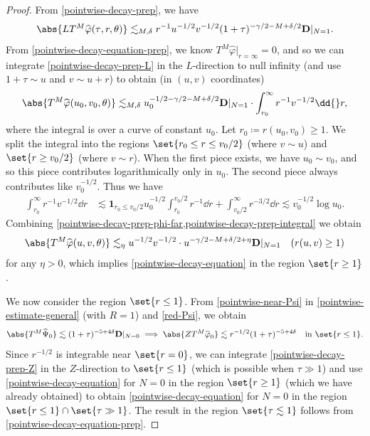 \documentclass[10pt, reqno]{amsart}
\begin{document}
\begin{proof}
From \cref{pointwise-decay-prep}, we have
\begin{equation}\label{pointwise-decay-prep-L}
\abs{LT^M\widehat{\varphi{}}(\tau{},r,\theta{})}\lesssim_{M,\delta{}} r^{-1}u^{-1/2}v^{-1/2}(1+\tau)^{-\gamma{}/2-M+\delta{}/2}\mathbf{D}|_{N=1}.
\end{equation}
From \cref{pointwise-decay-equation-prep}, we know \(T^M\widehat{\varphi{}}|_{r=\infty} = 0\),
and so we can integrate \cref{pointwise-decay-prep-L} in the \(L\)-direction to
null infinity (and use \(1 + \tau{}\sim u\) and \(v\sim u + r\)) to obtain (in \((u,v)\) coordinates)
\begin{equation}\label{pointwise-decay-prep-phi-far}
\abs{T^M\widehat{\varphi{}}(u_0,v_0,\theta{})}\lesssim_{M,\delta{}} u_0^{-1/2-\gamma{}/2-M+\delta{}/2}\mathbf{D}|_{N=1}\cdot \int_{r_0}^\infty r^{-1}v^{-1/2}\dd{}r,
\end{equation}
where the integral is over a curve of constant \(u_0\). Let
\(r_0\coloneqq{}r(u_0,v_0)\ge 1\). We split the integral into the regions
\(\set{r_0\le r\le v_0/2}\) (where \(v\sim u\)) and \(\set{r\ge v_0/2}\) (where
\(v\sim r\)). When the first piece exists, we have \(u_0\sim v_0\), and so this
piece contributes logarithmically only in \(u_0\). The second piece always
contributes like \(v_0^{-1/2}\). Thus we have
\begin{equation}\label{pointwise-decay-prep-integral}
\begin{split}
\int_{r_0}^\infty r^{-1}v^{-1/2}\dd{}r &\lesssim \mathbf{1}_{r_0\le v_0/2}u_0^{-1/2}\int_{r_0}^{v_0/2} r^{-1}\dd{}r + \int_{v_0/2}^\infty r^{-3/2}\dd{}r \lesssim v_0^{-1/2}\log u_0.
\end{split}
\end{equation}
Combining \cref{pointwise-decay-prep-phi-far,pointwise-decay-prep-integral} we
obtain
\begin{equation}
\abs{T^M\widehat{\varphi{}}(u,v,\theta{})}\lesssim_\eta{} u^{-1/2}v^{-1/2}\cdot u^{-\gamma{}/2-M+\delta{}/2+\eta{}}\mathbf{D}|_{N=1}\quad (r(u,v)\ge 1)
\end{equation}
for any \(\eta{} > 0\), which implies \cref{pointwise-decay-equation} in the region
\(\set{r\ge 1}\).

We now consider the region \(\set{r\le 1}\). From \cref{pointwise-near-Psi} in
\cref{pointwise-estimate-general} (with \(R = 1\)) and \cref{red-Psi}, we obtain
\begin{equation}\label{pointwise-decay-prep-Z}
\abs{T^M\widehat{\Psi{}}_0}\lesssim (1+\tau{})^{-5+4\delta{}}\mathbf{D}|_{N=0}\implies \abs{ZT^M\widehat{\varphi{}}_0}\lesssim r^{-1/2}(1+\tau{})^{-5+4\delta{}}\quad \textnormal{in }\set{r\le 1}.
\end{equation}
Since \(r^{-1/2}\) is integrable near \(\set{r=0}\), we can integrate
\cref{pointwise-decay-prep-Z} in the \(Z\)-direction to \(\set{r\le 1}\) (which is
possible when \(\tau{}\gg 1\)) and use \cref{pointwise-decay-equation} for \(N =
0\) in the region \(\set{r\ge 1}\) (which we have already obtained) to obtain
\cref{pointwise-decay-equation} for \(N = 0\) in the region \(\set{r\le 1}\cap
\set{\tau{}\gg 1}\). The result in the region \(\set{\tau{}\lesssim 1}\) follows
from \cref{pointwise-decay-equation-prep}.
\end{proof}
\appendix
\end{document}
